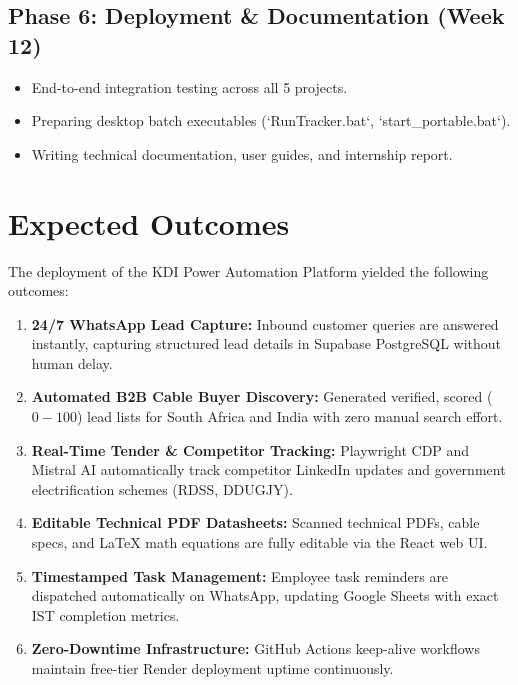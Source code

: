 \documentclass[12pt,a4paper]{report}
\begin{document}
\subsection{Phase 6: Deployment & Documentation (Week 12)}
\begin{itemize}[leftmargin=*,itemsep=2pt]
    \item End-to-end integration testing across all 5 projects.
    \item Preparing desktop batch executables (`RunTracker.bat`, `start_portable.bat`).
    \item Writing technical documentation, user guides, and internship report.
\end{itemize}

\section{Expected Outcomes}

The deployment of the KDI Power Automation Platform yielded the following outcomes:

\begin{enumerate}[leftmargin=*,itemsep=4pt]
    \item \textbf{24/7 WhatsApp Lead Capture:} Inbound customer queries are answered instantly, capturing structured lead details in Supabase PostgreSQL without human delay.

    \item \textbf{Automated B2B Cable Buyer Discovery:} Generated verified, scored ($0-100$) lead lists for South Africa and India with zero manual search effort.

    \item \textbf{Real-Time Tender & Competitor Tracking:} Playwright CDP and Mistral AI automatically track competitor LinkedIn updates and government electrification schemes (RDSS, DDUGJY).

    \item \textbf{Editable Technical PDF Datasheets:} Scanned technical PDFs, cable specs, and LaTeX math equations are fully editable via the React web UI.

    \item \textbf{Timestamped Task Management:} Employee task reminders are dispatched automatically on WhatsApp, updating Google Sheets with exact IST completion metrics.

    \item \textbf{Zero-Downtime Infrastructure:} GitHub Actions keep-alive workflows maintain free-tier Render deployment uptime continuously.
\end{enumerate}
\end{document}

